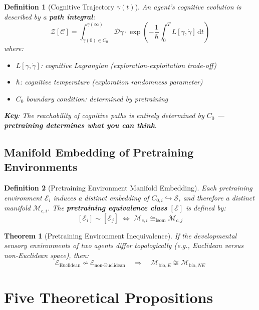 \documentclass[12pt, a4paper]{article}
\newtheorem{definition}{Definition}[section]
\newtheorem{theorem}{Theorem}[section]
\newcommand{\diff}{\mathrm{d}}
\begin{document}
\begin{definition}[Cognitive Trajectory $\gamma(t)$]\label{def:D17-2}
An agent's cognitive evolution is described by a \textbf{path integral}:
\[
\mathcal{Z}[\mathcal{C}] = \int_{\gamma(0) \in C_0}^{\gamma(\infty)} \mathcal{D}\gamma \cdot \exp\left(-\frac{1}{\hbar} \int_0^T L[\gamma, \dot{\gamma}] \, \diff t\right)
\]
where:
\begin{itemize}
    \item $L[\gamma, \dot{\gamma}]$: cognitive Lagrangian (exploration-exploitation trade-off)
    \item $\hbar$: cognitive temperature (exploration randomness parameter)
    \item $C_0$ boundary condition: determined by pretraining
\end{itemize}

\textbf{Key}: The reachability of cognitive paths is entirely determined by $C_0$ --- \textbf{pretraining determines what you can think}.
\end{definition}

\subsection{Manifold Embedding of Pretraining Environments}

\begin{definition}[Pretraining Environment Manifold Embedding]\label{def:D17-3}
Each pretraining environment $\mathcal{E}_i$ induces a distinct embedding of $C_{0,i} \hookrightarrow \mathcal{S}$, and therefore a distinct manifold $\mathcal{M}_{c,i}$. The \textbf{pretraining equivalence class} $[\mathcal{E}]$ is defined by:
\[
[\mathcal{E}_i] \sim [\mathcal{E}_j] \;\iff\; \mathcal{M}_{c,i} \cong_{\mathrm{Isom}} \mathcal{M}_{c,j}
\]
\end{definition}

\begin{theorem}[Pretraining Environment Inequivalence]\label{thm:D17-1}
If the developmental sensory environments of two agents differ topologically (e.g., Euclidean versus non-Euclidean space), then:
\[
\mathcal{E}_{\mathrm{Euclidean}} \not\sim \mathcal{E}_{\mathrm{non\text{-}Euclidean}}\quad\Rightarrow\quad \mathcal{M}_{\mathrm{bio},E} \not\cong \mathcal{M}_{\mathrm{bio},NE}
\]
\end{theorem}

\section{Five Theoretical Propositions}
\end{document}
